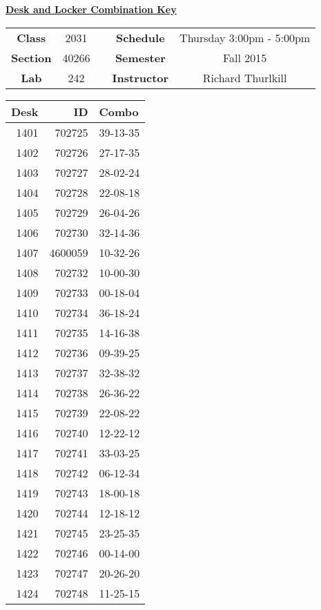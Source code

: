 \documentclass[12pt]{article}
\begin{document}
\thispagestyle{empty}

\begin{center}
	{\huge\textbf{\underline{ Desk and Locker Combination Key}}}
\end{center}


\begin{table}[h]
  \centering
  \begin{tabular}{ccccc}

  \textbf{Class} & 2031 & {\qquad} &\textbf{Schedule} & Thursday 3:00pm - 5:00pm \\
  \textbf{Section} & 40266 & {\qquad} & \textbf{Semester} & Fall 2015 \\
  \textbf{Lab} & 242 & {\qquad} & \textbf{Instructor} & Richard Thurlkill \\
  \end{tabular}
\end{table}
 \vspace{0.1in}
\begin{minipage}{0.4\textwidth}

\begin{tabular}{rrl}
\toprule
 Desk &       ID &     Combo \\
\midrule
 1401 &   702725 &  39-13-35 \\
 1402 &   702726 &  27-17-35 \\
 1403 &   702727 &  28-02-24 \\
 1404 &   702728 &  22-08-18 \\
 1405 &   702729 &  26-04-26 \\
 1406 &   702730 &  32-14-36 \\
 1407 &  4600059 &  10-32-26 \\
 1408 &   702732 &  10-00-30 \\
 1409 &   702733 &  00-18-04 \\
 1410 &   702734 &  36-18-24 \\
 1411 &   702735 &  14-16-38 \\
 1412 &   702736 &  09-39-25 \\
 1413 &   702737 &  32-38-32 \\
 1414 &   702738 &  26-36-22 \\
 1415 &   702739 &  22-08-22 \\
 1416 &   702740 &  12-22-12 \\
 1417 &   702741 &  33-03-25 \\
 1418 &   702742 &  06-12-34 \\
 1419 &   702743 &  18-00-18 \\
 1420 &   702744 &  12-18-12 \\
 1421 &   702745 &  23-25-35 \\
 1422 &   702746 &  00-14-00 \\
 1423 &   702747 &  20-26-20 \\
 1424 &   702748 &  11-25-15 \\
\bottomrule
\end{tabular}


\end{minipage}
\end{document}
